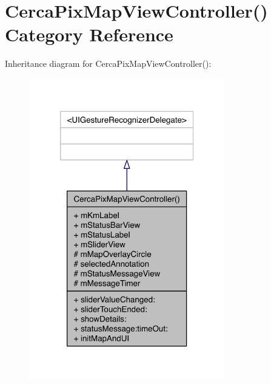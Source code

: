 \hypertarget{category_cerca_pix_map_view_controller_07_08}{\section{Cerca\-Pix\-Map\-View\-Controller() Category Reference}
\label{category_cerca_pix_map_view_controller_07_08}
}


Inheritance diagram for Cerca\-Pix\-Map\-View\-Controller()\-:\nopagebreak
\begin{figure}[H]
\begin{center}
\leavevmode
\includegraphics[width=242pt]{category_cerca_pix_map_view_controller_07_08__inherit__graph}
\end{center}
\end{figure}


